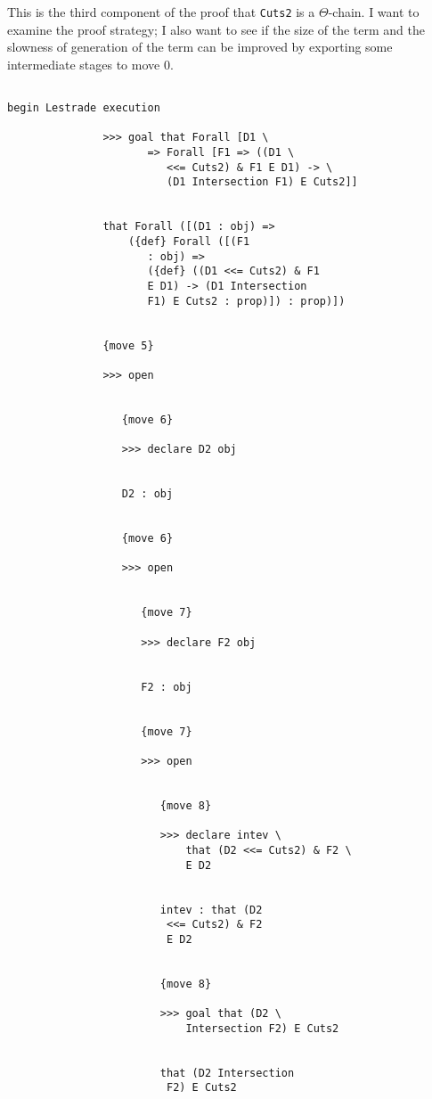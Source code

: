 \documentclass[12pt]{article}
\begin{document}
This is the third component of the proof that {\tt Cuts2} is a $\Theta$-chain.  I want to examine the proof strategy;  I also want to see if the size of the term and the slowness of generation of the term can be improved by exporting some intermediate stages to move 0.

\begin{verbatim}

begin Lestrade execution

               >>> goal that Forall [D1 \
                      => Forall [F1 => ((D1 \
                         <<= Cuts2) & F1 E D1) -> \
                         (D1 Intersection F1) E Cuts2]]


               that Forall ([(D1 : obj) => 
                   ({def} Forall ([(F1 
                      : obj) => 
                      ({def} ((D1 <<= Cuts2) & F1 
                      E D1) -> (D1 Intersection 
                      F1) E Cuts2 : prop)]) : prop)])


               {move 5}

               >>> open


                  {move 6}

                  >>> declare D2 obj


                  D2 : obj


                  {move 6}

                  >>> open


                     {move 7}

                     >>> declare F2 obj


                     F2 : obj


                     {move 7}

                     >>> open


                        {move 8}

                        >>> declare intev \
                            that (D2 <<= Cuts2) & F2 \
                            E D2


                        intev : that (D2 
                         <<= Cuts2) & F2 
                         E D2


                        {move 8}

                        >>> goal that (D2 \
                            Intersection F2) E Cuts2


                        that (D2 Intersection 
                         F2) E Cuts2



\end{verbatim}
\end{document}
